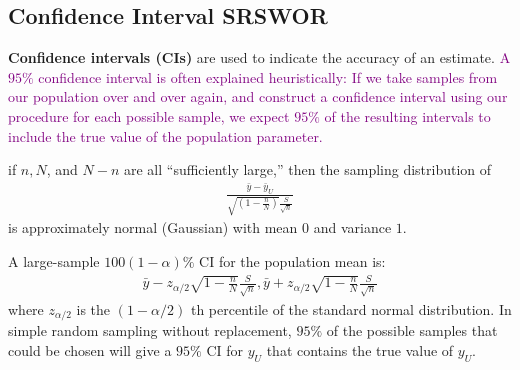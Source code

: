 \documentclass[a4paper,twoside,11pt]{article}
\begin{document}
\subsection{Confidence Interval SRSWOR}
\textbf{Confidence intervals (CIs)} are used to indicate the accuracy of an estimate.
\newline
\newline
\textcolor{Purple}{A $95\%$ confidence interval is often explained heuristically: If we take samples from our population over and over again, and construct a confidence interval using our procedure for each possible sample, we expect $95\%$ of the resulting intervals to include the true value of the population parameter.}
\begin{shaded*}
\noindent if $n, N$, and $N-n$ are all “sufficiently large,” then the sampling distribution of
\begin{equation*}
\begin{aligned}
\frac{\bar{y}-\bar{y}_U}{\sqrt{(1-\frac{n}{N})}\frac{S}{\sqrt{n}}}
\end{aligned}
\end{equation*}
is approximately normal (Gaussian) with mean $0$ and variance $1$.
\end{shaded*}
\noindent A large-sample $100(1-\alpha)\%$ CI for the population mean is:
\begin{equation*}
\begin{aligned}
\bar{y} - z_{\alpha/2} \sqrt{1-\frac{n}{N}}\frac{S}{\sqrt{n}}, \bar{y}+ z_{\alpha/2} \sqrt{1-\frac{n}{N}}\frac{S}{\sqrt{n}}
\end{aligned}
\end{equation*}
where $z_{\alpha/2}$ is the $(1-\alpha/2)$ th percentile of the standard normal distribution. In simple random sampling without replacement, $95\%$ of the possible samples that could be chosen will give a $95\%$ CI for $y_U$ that contains the true value of $y_U$.
\end{document}
